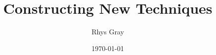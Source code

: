 \documentclass{article}
\title{Constructing New Techniques}
\author{Rhys Gray}
\date{\today}
\begin{document}
\maketitle






% 


%     
%     
%     
%     
%     
%     

\clearpage
\printglossary{}
\end{document}
